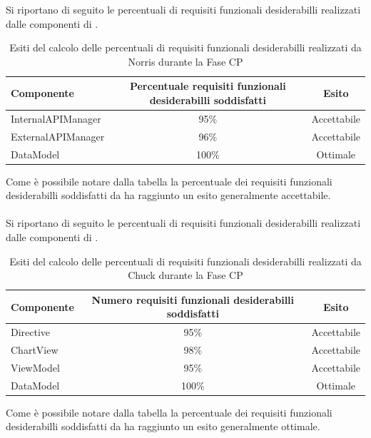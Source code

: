 
Si riportano di seguito le percentuali di requisiti funzionali desiderabilli realizzati dalle componenti di .
\begin{table}[H]
	\centering
		\begin{tabu}{| l | c | c |}
			\hline
			Componente	& Percentuale requisiti funzionali desiderabilli soddisfatti	& Esito		\\ \hline \hline
			InternalAPIManager	& 95\% 	& Accettabile  \\ \hline
			ExternalAPIManager  & 	96\%	& Accettabile  \\ \hline
			DataModel  & 	100\%	& Ottimale  \\ \hline
		\end{tabu}
	\caption{Esiti del calcolo delle percentuali di requisiti funzionali desiderabilli realizzati da Norris durante la Fase CP}
\end{table}
Come è possibile notare dalla tabella la percentuale dei requisiti funzionali desiderabilli soddisfatti da  ha raggiunto un esito generalmente accettabile. 
\\ \\
Si riportano di seguito le percentuali di requisiti funzionali desiderabilli realizzati dalle componenti di .
\begin{table}[H]
	\centering
		\begin{tabu}{| l | c | c |}
			\hline
			Componente	& Numero requisiti funzionali desiderabilli soddisfatti	& Esito		\\ \hline \hline
			Directive	& 95\% 	& Accettabile  \\ \hline
			ChartView  & 	98\%	& Accettabile  \\ \hline
			ViewModel  & 	95\%	& Accettabile  \\ \hline
			DataModel  & 	100\%	& Ottimale  \\ \hline
		\end{tabu}
	\caption{Esiti del calcolo delle percentuali di requisiti funzionali desiderabilli realizzati da Chuck durante la Fase CP}
\end{table}
Come è possibile notare dalla tabella la percentuale dei requisiti funzionali desiderabilli soddisfatti da  ha raggiunto un esito generalmente ottimale.


